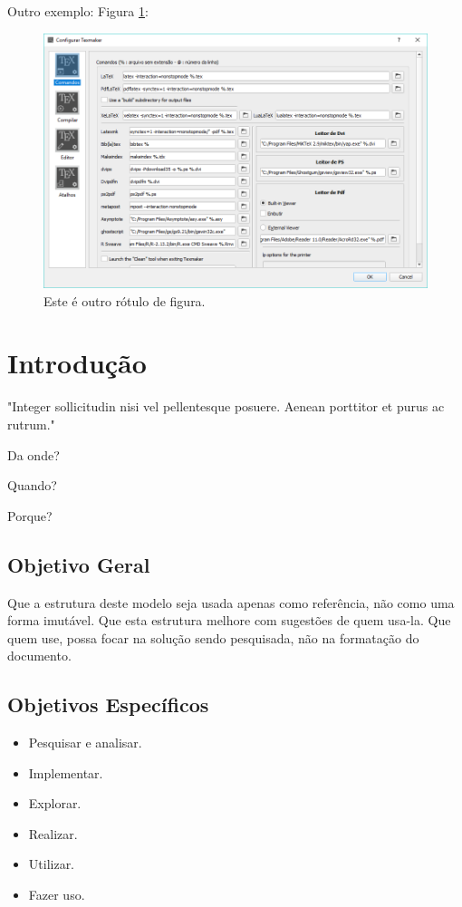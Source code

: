 \documentclass[
	article,			%
	11pt,				%
	oneside,			%
	a4paper,			%
	chapter=TITLE,		%
	section=TITLE,		%
	subsection=TITLE,	%
	subsubsection=TITLE, %
	english,			%
	brazil,				%
	sumario=tradicional
	]{ifrs-farr-artigo-abntex2}
\begin{document}
Outro exemplo: Figura \ref{fig_config_comand}:

\begin{figure}[h]
	\caption{\label{fig_config_comand}Este é outro rótulo de figura.}
	\begin{center}
	    \includegraphics[scale=0.5]{figuras/config_comandos_texmaker.png}
	\end{center}
\end{figure}

\newpage
\section{Introdução}
\begin{citacao}
"Integer sollicitudin nisi vel pellentesque posuere. Aenean porttitor et purus ac rutrum.\cite{costa2009}"
\end{citacao}

Da onde?

Quando?

Porque?

\subsection{Objetivo Geral}
Que a estrutura deste modelo seja usada apenas como referência, não como uma forma imutável. Que esta estrutura melhore com sugestões de quem usa-la. Que quem use, possa focar na solução sendo pesquisada, não na formatação do documento.

\subsection{Objetivos Específicos}
\begin{itemize}
    \item Pesquisar e analisar.
	\item Implementar.
	\item Explorar.
	\item Realizar.
	\item Utilizar.
	\item Fazer uso.
\end{itemize}
\end{document}
